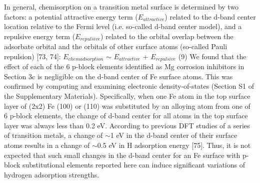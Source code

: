 In general, chemisorption on a transition metal surface is determined by two factors: a potential attractive energy term ($E_{attractive}$) related to the d-band center location relative to the Fermi level (i.e. so-called d-band center model), and a repulsive energy term ($E_{repulsive}$) related to the orbital overlap between the adsorbate orbital and the orbitals of other surface atoms (so-called Pauli repulsion) [73, 74]:
$E_{chem adsorption}$ $\sim$ $E_{attractive}$ + $E_{repulsive}$  (9)
We found that the effect of each of the 6 p-block elements identified as Mg corrosion inhibitors in Section 3c is negligible on the d-band center of Fe surface atoms. This was confirmed by computing and examining electronic density-of-states (Section S1 of the Supplementary Materials). Specifically, when one Fe atom in the top surface layer of (2x2) Fe (100) or (110) was substituted by an alloying atom from one of 6 p-block elements, the change of d-band center for all atoms in the top surface layer was always less than 0.2 eV. According to previous DFT studies of a series of transition metals, a change of $\sim$1 eV in the d-band center of their surface atoms results in a change of $\sim$0.5 eV in H adsorption energy [75]. Thus, it is not expected that such small changes in the d-band center for an Fe surface with p-block substitutional elements reported here can induce significant variations of hydrogen adsorption strengths.

